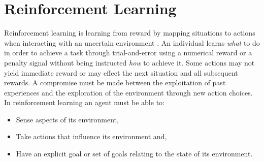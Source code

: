 \newpage
\section{Reinforcement Learning}
\label{sec:rl}

Reinforcement learning is learning from reward by mapping situations to actions
when interacting with an uncertain environment
\cite{suttonbarto:1998,bertsekas:96,kaelbling:1996}.  An individual learns
\textit{what} to do in order to achieve a task through trial-and-error using a
numerical reward or a penalty signal without being instructed \textit{how} to
achieve it.  Some actions may not yield immediate reward or may effect the next
situation and all subsequent rewards.  A compromise must be made between the
exploitation of past experiences and the exploration of the environment through
new action choices. In reinforcement learning an agent must be able to:
\begin{itemize}
  \item Sense aspects of its environment,
  \item Take actions that influence its environment and,
  \item Have an explicit goal or set of goals relating to the state of its
  environment.
\end{itemize}

